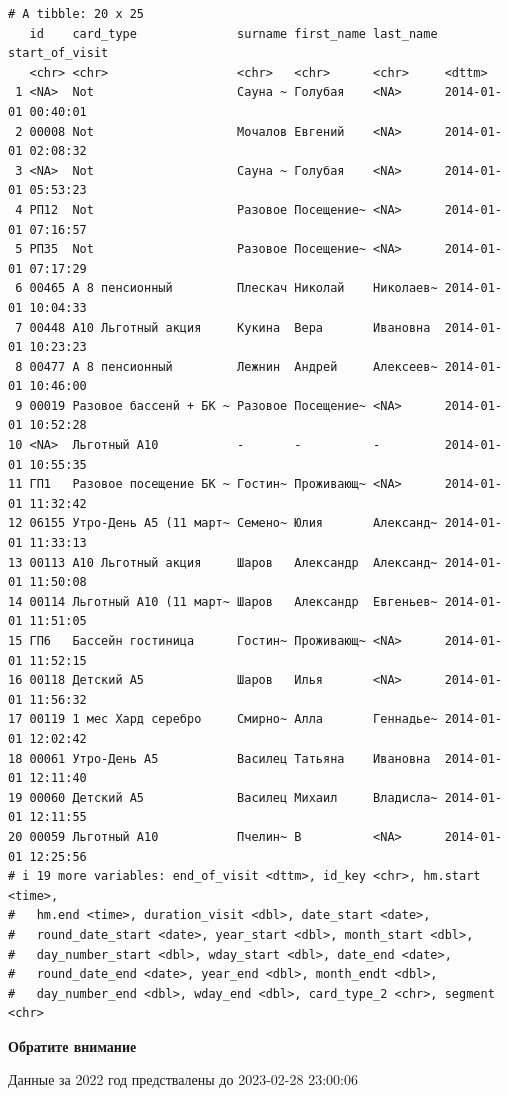 \documentclass[
  letterpaper,
  DIV=11,
  numbers=noendperiod]{scrartcl}
\begin{document}
\begin{verbatim}
# A tibble: 20 x 25
   id    сard_type              surname first_name last_name start_of_visit     
   <chr> <chr>                  <chr>   <chr>      <chr>     <dttm>             
 1 <NA>  Not                    Сауна ~ Голубая    <NA>      2014-01-01 00:40:01
 2 00008 Not                    Мочалов Евгений    <NA>      2014-01-01 02:08:32
 3 <NA>  Not                    Сауна ~ Голубая    <NA>      2014-01-01 05:53:23
 4 РП12  Not                    Разовое Посещение~ <NA>      2014-01-01 07:16:57
 5 РП35  Not                    Разовое Посещение~ <NA>      2014-01-01 07:17:29
 6 00465 А 8 пенсионный         Плескач Николай    Николаев~ 2014-01-01 10:04:33
 7 00448 А10 Льготный акция     Кукина  Вера       Ивановна  2014-01-01 10:23:23
 8 00477 А 8 пенсионный         Лежнин  Андрей     Алексеев~ 2014-01-01 10:46:00
 9 00019 Разовое бассенй + БК ~ Разовое Посещение~ <NA>      2014-01-01 10:52:28
10 <NA>  Льготный А10           -       -          -         2014-01-01 10:55:35
11 ГП1   Разовое посещение БК ~ Гостин~ Проживающ~ <NA>      2014-01-01 11:32:42
12 06155 Утро-День А5 (11 март~ Семено~ Юлия       Александ~ 2014-01-01 11:33:13
13 00113 А10 Льготный акция     Шаров   Александр  Александ~ 2014-01-01 11:50:08
14 00114 Льготный А10 (11 март~ Шаров   Александр  Евгеньев~ 2014-01-01 11:51:05
15 ГП6   Бассейн гостиница      Гостин~ Проживающ~ <NA>      2014-01-01 11:52:15
16 00118 Детский А5             Шаров   Илья       <NA>      2014-01-01 11:56:32
17 00119 1 мес Хард серебро     Смирно~ Алла       Геннадье~ 2014-01-01 12:02:42
18 00061 Утро-День А5           Василец Татьяна    Ивановна  2014-01-01 12:11:40
19 00060 Детский А5             Василец Михаил     Владисла~ 2014-01-01 12:11:55
20 00059 Льготный А10           Пчелин~ В          <NA>      2014-01-01 12:25:56
# i 19 more variables: end_of_visit <dttm>, id_key <chr>, hm.start <time>,
#   hm.end <time>, duration_visit <dbl>, date_start <date>,
#   round_date_start <date>, year_start <dbl>, month_start <dbl>,
#   day_number_start <dbl>, wday_start <dbl>, date_end <date>,
#   round_date_end <date>, year_end <dbl>, month_endt <dbl>,
#   day_number_end <dbl>, wday_end <dbl>, сard_type_2 <chr>, segment <chr>
\end{verbatim}

\begin{tcolorbox}[enhanced jigsaw, colframe=quarto-callout-important-color-frame, leftrule=.75mm, rightrule=.15mm, toprule=.15mm, left=2mm, arc=.35mm, bottomrule=.15mm, colback=white, breakable, opacityback=0]
\begin{minipage}[t]{5.5mm}
\textcolor{quarto-callout-important-color}{\faExclamation}
\end{minipage}%
\begin{minipage}[t]{\textwidth - 5.5mm}

\textbf{Обратите внимание}\vspace{2mm}

Данные за 2022 год предствалены до 2023-02-28 23:00:06

\end{minipage}%
\end{tcolorbox}
\end{document}
